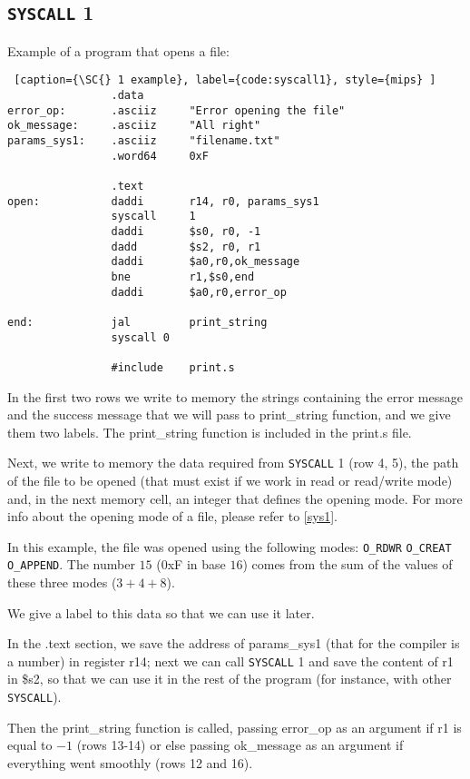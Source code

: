 \documentclass[12pt]{report}
\newcommand{\SC}{\texttt{SYSCALL}}
\begin{document}
\subsection{\SC{} 1}
Example of a program that opens a file:
\begin{lstlisting} [caption={\SC{} 1 example}, label={code:syscall1}, style={mips} ] 
                .data 
error_op:       .asciiz     "Error opening the file"    
ok_message:     .asciiz     "All right"
params_sys1:    .asciiz     "filename.txt"
                .word64     0xF                    

                .text
open:           daddi       r14, r0, params_sys1    
                syscall     1    
                daddi       $s0, r0, -1
                dadd        $s2, r0, r1        
                daddi       $a0,r0,ok_message            
                bne         r1,$s0,end            
                daddi       $a0,r0,error_op

end:            jal         print_string
                syscall 0
        
                #include    print.s      
\end{lstlisting}
In the first two rows we write to memory the strings containing the error
message and the success message that we will pass to print\_string function, and
we give them two labels. The print\_string function is included in the print.s
file.

Next, we write to memory the data required from \SC{} 1 (row 4, 5), the path of
the file to be opened (that must exist if we work in read or read/write mode)
and, in the next memory cell, an integer that defines the opening mode. For more
info about the opening mode of a file, please refer to \ref{sys1}.

In this example, the file was opened using the following modes: 
\texttt{O\_RDWR} \textbar{} \texttt{O\_CREAT} \textbar{} \texttt{O\_APPEND}. The
number $15$ (0xF in base $16$) comes from the sum of the values of these three
modes ($3 + 4 + 8$).

We give a label to this data so that we can use it later.

In the .text section, we save the address of params\_sys1 (that for the compiler
is a number) in register r14; next we can call \SC{} 1 and save the content of
r1 in \$s2, so that we can use it in the rest of the program (for instance, with
other \SC{}).

Then the print\_string function is called, passing error\_op as an argument if
r1 is equal to $-1$ (rows 13-14) or else passing ok\_message as an argument if
everything went smoothly (rows 12 and 16).

\printindex
\end{document}
